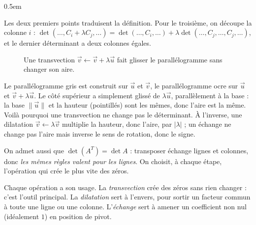 \documentclass[a4paper,11pt]{article}
\makeatletter
\numberwithin{equation}{section}
\numberwithin{figure}{section}
\numberwithin{table}{section}
\theoremstyle{enonce}
\theoremstyle{exemple}
\theoremstyle{remarque}
\renewcommand{\proofname}{Démonstration}
\renewenvironment{proof}[1][\proofname]{\par\pushQED{\qed}\normalfont
  \topsep0.5em\relax\trivlist\item[\hskip\labelsep\sffamily\itshape\color{Gris}#1.]\ignorespaces}
  {\popQED\endtrivlist\@endpefalse}
\newcommand{\ve}[1]{\vec{#1}}
\makeatother
\begin{document}
\begin{proof}
Les deux premiers points traduisent la définition. Pour le troisième, on découpe la colonne $i$ :
$\det(\dots,C_i+\lambda C_j,\dots)=\det(\dots,C_i,\dots)+\lambda\det(\dots,C_j,\dots,C_j,\dots)$, et le dernier
déterminant a deux colonnes égales.
\end{proof}

\begin{figure}[H]
\centering
{}
\caption{Une transvection $\ve v\leftarrow\ve v+\lambda\ve u$ fait glisser le parallélogramme sans changer son aire.}\label{fig:transvection}
\end{figure}

\begin{lecture}
Le parallélogramme gris est construit sur $\ve u$ et $\ve v$, le parallélogramme ocre sur $\ve u$ et $\ve v+\lambda\ve u$. Le
côté supérieur a simplement glissé de $\lambda\ve u$, parallèlement à la base : la base $\|\ve u\|$ et la hauteur (pointillés)
sont les mêmes, donc l'aire est la même. Voilà pourquoi une transvection ne change pas le déterminant. À l'inverse, une
dilatation $\ve v\leftarrow\lambda\ve v$ multiplie la hauteur, donc l'aire, par $|\lambda|$ ; un échange ne change pas l'aire
mais inverse le sens de rotation, donc le signe.
\end{lecture}

On admet aussi que $\det(A^T)=\det A$ : transposer échange lignes et colonnes, donc \emph{les mêmes règles valent pour
les lignes}. On choisit, à chaque étape, l'opération qui crée le plus vite des zéros.

\begin{enpratique}
Chaque opération a son usage. La \emph{transvection} crée des zéros sans rien changer : c'est l'outil principal.
La \emph{dilatation} sert à l'envers, pour sortir un facteur commun à toute une ligne ou une colonne. L'\emph{échange}
sert à amener un coefficient non nul (idéalement $1$) en position de pivot.
\end{enpratique}
\end{document}
